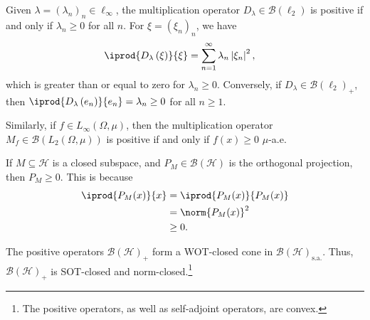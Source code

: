 \documentclass[10pt]{mypackage}
\newcommand{\sa}{\text{s.a.}}
\begin{document}
\begin{example}
  Given $\lambda = \left(\lambda_n\right)_n\in \ell_{\infty}$, the multiplication operator $D_{\lambda}\in \mathcal{B}\left(\ell_2\right)$ is positive if and only if $\lambda_n\geq 0$ for all $n$. For $\xi = \left(\xi_n\right)_n$, we have
  \begin{align*}
    \iprod{D_{\lambda}\left(\xi\right)}{\xi} &= \sum_{n=1}^{\infty}\lambda_n\left\vert \xi_n \right\vert^2,
  \end{align*}
  which is greater than or equal to zero for $\lambda_n \geq 0$. Conversely, if $D_{\lambda}\in \mathcal{B}\left(\ell_2\right)_{+}$, then $ \iprod{D_{\lambda}\left(e_n\right)}{e_n} = \lambda_n \geq 0 $ for all $n\geq 1$.\newline

  Similarly, if $f\in L_{\infty}\left(\Omega,\mu\right)$, then the multiplication operator $M_{f}\in \mathcal{B}\left(L_{2}\left(\Omega,\mu\right)\right)$ is positive if and only if $f(x)\geq 0$ $\mu$-a.e.
\end{example}
\begin{example}
  If $M\subseteq \mathcal{H}$ is a closed subspace, and $P_{M}\in \mathcal{B}\left(\mathcal{H}\right)$ is the orthogonal projection, then $P_M \geq 0$. This is because
  \begin{align*}
    \iprod{P_M(x)}{x} &= \iprod{P_M(x)}{P_M(x)}\\
                      &= \norm{P_M(x)}^2\\
                      &\geq 0.
  \end{align*}
\end{example}
\begin{proposition}
  The positive operators $\mathcal{B}\left(\mathcal{H}\right)_{+}$ form a WOT-closed cone in $\mathcal{B}\left(\mathcal{H}\right)_{\sa}$. Thus, $\mathcal{B}\left(\mathcal{H}\right)_{+}$ is SOT-closed and norm-closed.\footnote{The positive operators, as well as self-adjoint operators, are convex.}
\end{proposition}
\end{document}
